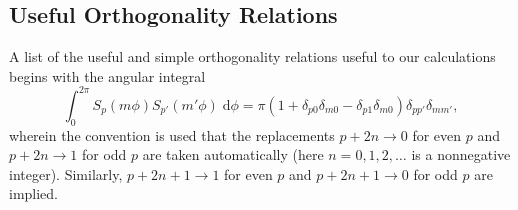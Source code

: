







\subsection{Useful Orthogonality Relations}\label{sec:simpleOrthogonality}

A list of the useful and simple orthogonality relations useful to our calculations begins with the angular integral
\begin{equation}
\int_0^{2\pi}S_p(m\phi)S_{p'}(m'\phi)\;\mathrm{d}\phi = \pi(1 + \delta_{p0}\delta_{m0} - \delta_{p1}\delta_{m0})\delta_{pp'}\delta_{mm'},
\end{equation}
wherein the convention is used that the replacements $p + 2n\to 0$ for even $p$ and $p + 2n\to1$ for odd $p$ are taken automatically (here $n = 0,1,2,\ldots$ is a nonnegative integer). Similarly, $p + 2n + 1\to 1$ for even $p$ and $p + 2n + 1\to0$ for odd $p$ are implied. 

